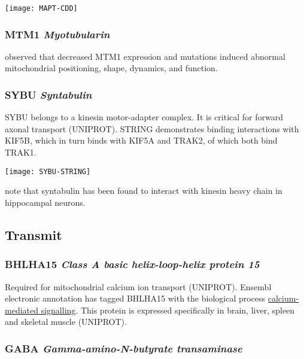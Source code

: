 \begin{center}
  \texttt{[image: MAPT-CDD]}
\end{center}

\subsubsection{MTM1 \textit{Myotubularin}}

\cite{Hnia2011} observed that decreased MTM1 expression and mutations
induced abnormal mitochondrial positioning, shape, dynamics, and function.

\subsubsection{SYBU \textit{Syntabulin}}

SYBU belongs to a kinesin motor-adapter complex. It is critical for forward
axonal transport (UNIPROT). STRING demonstrates binding interactions with
KIF5B, which in turn binds with KIF5A and TRAK2, of which both bind TRAK1.

\begin{center}
  \texttt{[image: SYBU-STRING]}
\end{center}

\cite{Reis2009} note that syntabulin has been found to interact with kinesin
heavy chain in hippocampal neurons.

\subsection{Transmit}

\subsubsection{BHLHA15 \textit{Class A basic helix-loop-helix protein 15}}

Required for mitochondrial calcium ion transport (UNIPROT). Ensembl electronic
annotation has tagged BHLHA15 with the biological process
\href{http://www.ebi.ac.uk/QuickGO/GTerm?id=GO:0019722}{calcium-mediated
signalling}. This protein is expressed specifically in brain, liver,
spleen and skeletal muscle (UNIPROT).

\subsubsection{GABA \textit{Gamma-amino-N-butyrate transaminase}}

